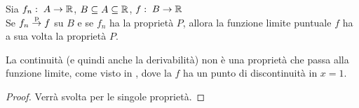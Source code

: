 \begin{proposition}
	Sia $f_n:\; A \to \mathbb{R}$, $B \subseteq A \subseteq \mathbb{R}$, $f:\; B \to \mathbb{R}$\\
	Se $f_n \overset{\text{p}}{\to} f$ su $B$ e se $f_n$ ha la proprietà $P$, allora la funzione limite puntuale $f$ ha a sua volta la proprietà $P$.
	\begin{note}
		La continuità (e quindi anche la derivabilità) non è una proprietà che passa alla funzione limite, come visto in , dove la $f$ ha un punto di discontinuità in $x = 1$.
	\end{note}
	\begin{proof}
		Verrà svolta per le singole proprietà.
	\end{proof}
\end{proposition}
